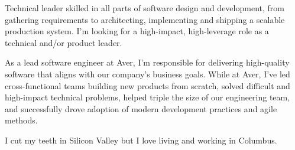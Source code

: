

\begin{cvparagraph}

Technical leader skilled in all parts of software design and development, from gathering requirements to architecting, implementing and shipping a scalable production system.
I'm looking for a high-impact, high-leverage role as a technical and/or product leader.

As a lead software engineer at Aver, I'm responsible for delivering high-quality software that aligns with our company's business goals.
While at Aver, I've led cross-functional teams building new products from scratch, solved difficult and high-impact technical problems, helped triple the size of our engineering team, and successfully drove adoption of modern development practices and agile methods.

I cut my teeth in Silicon Valley but I love living and working in Columbus.

\end{cvparagraph}
